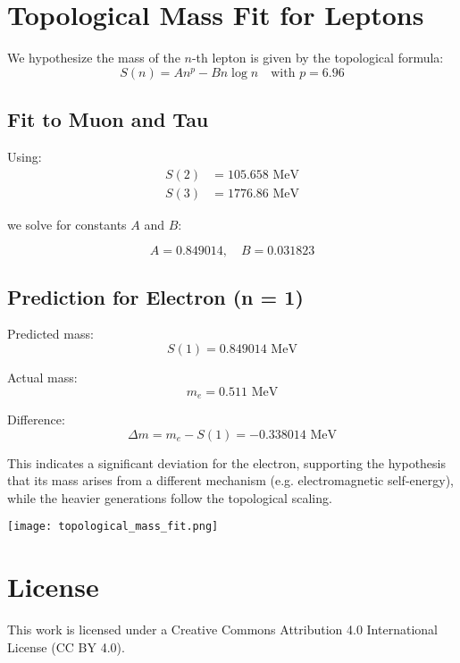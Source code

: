 \documentclass{article}
\begin{document}
\section*{Topological Mass Fit for Leptons}

We hypothesize the mass of the $n$-th lepton is given by the topological formula:
\[
S(n) = A n^p - B n \log n \quad \text{with } p = 6.96
\]

\subsection*{Fit to Muon and Tau}

Using:
\begin{align*}
S(2) &= 105.658 \text{ MeV} \\
S(3) &= 1776.86 \text{ MeV}
\end{align*}

we solve for constants $A$ and $B$:

\[
A = 0.849014, \quad B = 0.031823
\]

\subsection*{Prediction for Electron (n = 1)}

Predicted mass:
\[
S(1) = 0.849014 \text{ MeV}
\]

Actual mass:
\[
m_e = 0.511 \text{ MeV}
\]

Difference:
\[
\Delta m = m_e - S(1) = -0.338014 \text{ MeV}
\]

This indicates a significant deviation for the electron, supporting the hypothesis that its mass arises from a different mechanism (e.g. electromagnetic self-energy), while the heavier generations follow the topological scaling.

\texttt{[image: topological\_mass\_fit.png]}


\section*{License}
This work is licensed under a Creative Commons Attribution 4.0 International License (CC BY 4.0).
\end{document}
